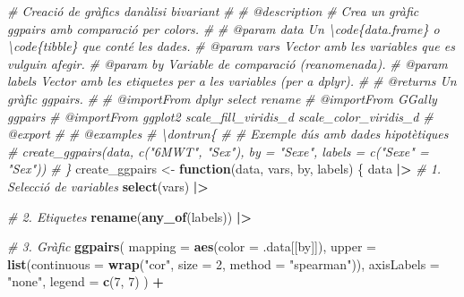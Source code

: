 \documentclass[CAT]{TFUOC}%
\newenvironment{Shaded}{\begin{snugshade}}{\end{snugshade}}
\newcommand{\AttributeTok}[1]{\textcolor[rgb]{0.13,0.29,0.53}{#1}}
\newcommand{\CommentTok}[1]{\textcolor[rgb]{0.56,0.35,0.01}{\textit{#1}}}
\newcommand{\ControlFlowTok}[1]{\textcolor[rgb]{0.13,0.29,0.53}{\textbf{#1}}}
\newcommand{\DecValTok}[1]{\textcolor[rgb]{0.00,0.00,0.81}{#1}}
\newcommand{\FunctionTok}[1]{\textcolor[rgb]{0.13,0.29,0.53}{\textbf{#1}}}
\newcommand{\NormalTok}[1]{#1}
\newcommand{\OtherTok}[1]{\textcolor[rgb]{0.56,0.35,0.01}{#1}}
\newcommand{\SpecialCharTok}[1]{\textcolor[rgb]{0.81,0.36,0.00}{\textbf{#1}}}
\newcommand{\StringTok}[1]{\textcolor[rgb]{0.31,0.60,0.02}{#1}}
\begin{document}
\begin{Shaded}
\begin{Highlighting}[]
\CommentTok{\#\textquotesingle{} Creació de gràfics d\textquotesingle{}anàlisi bivariant}
\CommentTok{\#\textquotesingle{} }
\CommentTok{\#\textquotesingle{} @description}
\CommentTok{\#\textquotesingle{} Crea un gràfic ggpairs amb comparació per colors.}
\CommentTok{\#\textquotesingle{} }
\CommentTok{\#\textquotesingle{} @param data Un \textbackslash{}code\{data.frame\} o \textbackslash{}code\{tibble\} que conté les dades.}
\CommentTok{\#\textquotesingle{} @param vars Vector amb les variables que es vulguin afegir.}
\CommentTok{\#\textquotesingle{} @param by Variable de comparació (reanomenada).}
\CommentTok{\#\textquotesingle{} @param labels Vector amb les etiquetes per a les variables (per a dplyr).}
\CommentTok{\#\textquotesingle{}}
\CommentTok{\#\textquotesingle{} @returns Un gràfic ggpairs.}
\CommentTok{\#\textquotesingle{} }
\CommentTok{\#\textquotesingle{} @importFrom dplyr select rename}
\CommentTok{\#\textquotesingle{} @importFrom GGally ggpairs}
\CommentTok{\#\textquotesingle{} @importFrom ggplot2 scale\_fill\_viridis\_d scale\_color\_viridis\_d}
\CommentTok{\#\textquotesingle{} @export}
\CommentTok{\#\textquotesingle{}}
\CommentTok{\#\textquotesingle{} @examples}
\CommentTok{\#\textquotesingle{} \textbackslash{}dontrun\{}
\CommentTok{\#\textquotesingle{} \# Exemple d\textquotesingle{}ús amb dades hipotètiques}
\CommentTok{\#\textquotesingle{} create\_ggpairs(data, c("6MWT", "Sex"), by = "Sexe", labels = c("Sexe" = "Sex"))}
\CommentTok{\#\textquotesingle{} \}}
\NormalTok{create\_ggpairs }\OtherTok{\textless{}{-}} \ControlFlowTok{function}\NormalTok{(data, vars, by, labels) \{}
\NormalTok{  data }\SpecialCharTok{|\textgreater{}} 
    \CommentTok{\# 1. Selecció de variables}
    \FunctionTok{select}\NormalTok{(vars) }\SpecialCharTok{|\textgreater{}} 
    
    \CommentTok{\# 2. Etiquetes}
    \FunctionTok{rename}\NormalTok{(}\FunctionTok{any\_of}\NormalTok{(labels)) }\SpecialCharTok{|\textgreater{}} 
    
    \CommentTok{\# 3. Gràfic}
    \FunctionTok{ggpairs}\NormalTok{(}
      \AttributeTok{mapping =} \FunctionTok{aes}\NormalTok{(}\AttributeTok{color =}\NormalTok{ .data[[by]]), }
      \AttributeTok{upper =} \FunctionTok{list}\NormalTok{(}\AttributeTok{continuous =} \FunctionTok{wrap}\NormalTok{(}\StringTok{"cor"}\NormalTok{, }\AttributeTok{size =} \DecValTok{2}\NormalTok{, }\AttributeTok{method =} \StringTok{"spearman"}\NormalTok{)), }
      \AttributeTok{axisLabels =} \StringTok{"none"}\NormalTok{, }
      \AttributeTok{legend =} \FunctionTok{c}\NormalTok{(}\DecValTok{7}\NormalTok{, }\DecValTok{7}\NormalTok{)}
\NormalTok{    ) }\SpecialCharTok{+} 
    

\end{Highlighting}
\end{Shaded}
\end{document}
